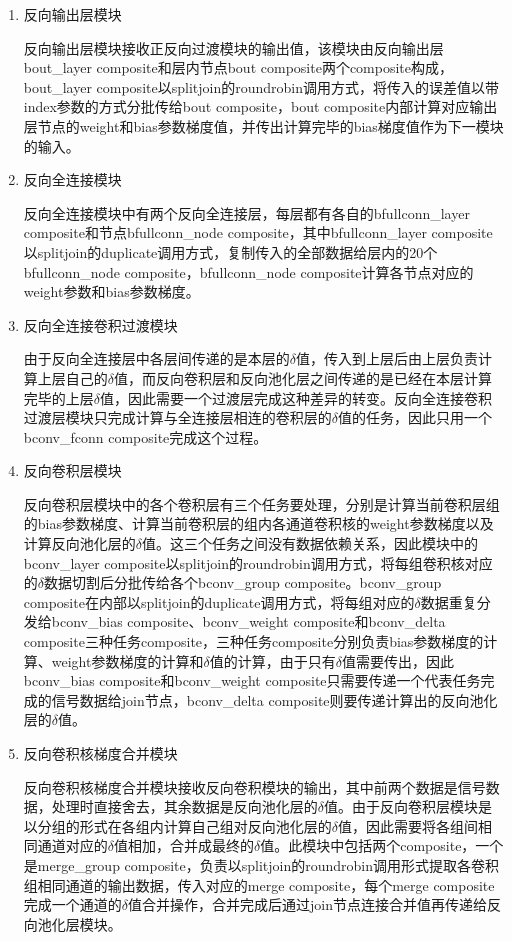 \begin{enumerate}

\item 反向输出层模块

反向输出层模块接收正反向过渡模块的输出值，该模块由反向输出层bout\_layer composite和层内节点bout composite两个composite构成，bout\_layer composite以splitjoin的roundrobin调用方式，将传入的误差值以带index参数的方式分批传给bout composite，bout composite内部计算对应输出层节点的weight和bias参数梯度值，并传出计算完毕的bias梯度值作为下一模块的输入。

\item 反向全连接模块

反向全连接模块中有两个反向全连接层，每层都有各自的bfullconn\_layer composite和节点bfullconn\_node composite，其中bfullconn\_layer composite以splitjoin的duplicate调用方式，复制传入的全部数据给层内的20个bfullconn\_node composite，bfullconn\_node composite计算各节点对应的weight参数和bias参数梯度。

\item 反向全连接卷积过渡模块

由于反向全连接层中各层间传递的是本层的$\delta$值，传入到上层后由上层负责计算上层自己的$\delta$值，而反向卷积层和反向池化层之间传递的是已经在本层计算完毕的上层$\delta$值，因此需要一个过渡层完成这种差异的转变。反向全连接卷积过渡层模块只完成计算与全连接层相连的卷积层的$\delta$值的任务，因此只用一个bconv\_fconn composite完成这个过程。

\item 反向卷积层模块

反向卷积层模块中的各个卷积层有三个任务要处理，分别是计算当前卷积层组的bias参数梯度、计算当前卷积层的组内各通道卷积核的weight参数梯度以及计算反向池化层的$\delta$值。这三个任务之间没有数据依赖关系，因此模块中的bconv\_layer composite以splitjoin的roundrobin调用方式，将每组卷积核对应的$\delta$数据切割后分批传给各个bconv\_group composite。bconv\_group composite在内部以splitjoin的duplicate调用方式，将每组对应的$\delta$数据重复分发给bconv\_bias composite、bconv\_weight composite和bconv\_delta composite三种任务composite，三种任务composite分别负责bias参数梯度的计算、weight参数梯度的计算和$\delta$值的计算，由于只有$\delta$值需要传出，因此bconv\_bias composite和bconv\_weight composite只需要传递一个代表任务完成的信号数据给join节点，bconv\_delta composite则要传递计算出的反向池化层的$\delta$值。

\item 反向卷积核梯度合并模块

反向卷积核梯度合并模块接收反向卷积模块的输出，其中前两个数据是信号数据，处理时直接舍去，其余数据是反向池化层的$\delta$值。由于反向卷积层模块是以分组的形式在各组内计算自己组对反向池化层的$\delta$值，因此需要将各组间相同通道对应的$\delta$值相加，合并成最终的$\delta$值。此模块中包括两个composite，一个是merge\_group composite，负责以splitjoin的roundrobin调用形式提取各卷积组相同通道的输出数据，传入对应的merge composite，每个merge composite完成一个通道的$\delta$值合并操作，合并完成后通过join节点连接合并值再传递给反向池化层模块。


\end{enumerate}
